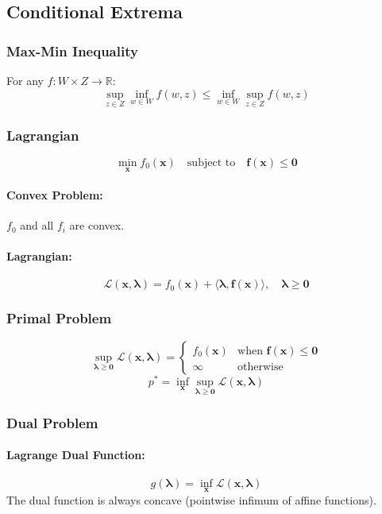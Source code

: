 \documentclass{article}
\begin{document}
\subsection{Conditional Extrema}

\subsubsection{Max-Min Inequality}
For any $f: W \times Z \to \mathbb{R}$:
\[
    \sup_{z \in Z} \inf_{w \in W} f(w, z) \le \inf_{w \in W} \sup_{z \in Z} f(w, z)
\]

\subsubsection{Lagrangian}
\[
    \min_{\mathbf{x}} f_0(\mathbf{x}) \quad \text{subject to} \quad \mathbf{f}(\mathbf{x}) \le \mathbf{0}
\]
\paragraph{Convex Problem:} $f_0$ and all $f_i$ are convex.

\paragraph{Lagrangian:}
\[
    \mathcal{L}(\mathbf{x}, \boldsymbol{\lambda}) = f_0(\mathbf{x}) + \langle \boldsymbol{\lambda}, \mathbf{f}(\mathbf{x}) \rangle, \quad \boldsymbol{\lambda} \ge \mathbf{0}
\]

\subsubsection{Primal Problem}
\[
    \sup_{\boldsymbol{\lambda} \ge \mathbf{0}} \mathcal{L}(\mathbf{x}, \boldsymbol{\lambda}) =
    \begin{cases}
        f_0(\mathbf{x}) & \text{when } \mathbf{f}(\mathbf{x}) \le \mathbf{0} \\
        \infty           & \text{otherwise}
    \end{cases}
\]
\[
    p^* = \inf_{\mathbf{x}} \sup_{\boldsymbol{\lambda} \ge \mathbf{0}} \mathcal{L}(\mathbf{x}, \boldsymbol{\lambda})
\]

\subsubsection{Dual Problem}

\paragraph{Lagrange Dual Function:}
\[
    g(\boldsymbol{\lambda}) = \inf_{\mathbf{x}} \mathcal{L}(\mathbf{x}, \boldsymbol{\lambda})
\]
The dual function is always concave (pointwise infimum of affine functions).
\end{document}
